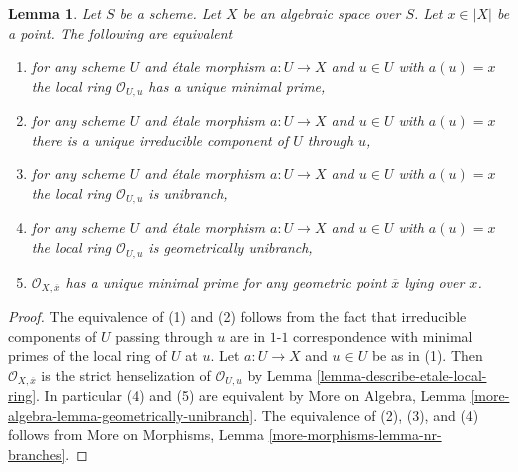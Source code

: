 \documentclass[10pt,a4paper]{amsart}
\theoremstyle{plain}
\newtheorem{lemma}[subsection]{Lemma}
\theoremstyle{definition}
\theoremstyle{remark}
\numberwithin{equation}{subsection}
\begin{document}
\begin{lemma}
\label{lemma-irreducible-local-ring}
Let $S$ be a scheme.
Let $X$ be an algebraic space over $S$.
Let $x \in |X|$ be a point.
The following are equivalent
\begin{enumerate}
\item for any scheme $U$ and \'etale morphism $a : U \to X$ and
$u \in U$ with $a(u) = x$ the local ring $\mathcal{O}_{U, u}$ has a
unique minimal prime,
\item for any scheme $U$ and \'etale morphism $a : U \to X$ and
$u \in U$ with $a(u) = x$ there is a unique irreducible component of $U$
through $u$,
\item for any scheme $U$ and \'etale morphism $a : U \to X$ and
$u \in U$ with $a(u) = x$ the local ring $\mathcal{O}_{U, u}$
is unibranch,
\item for any scheme $U$ and \'etale morphism $a : U \to X$ and
$u \in U$ with $a(u) = x$ the local ring $\mathcal{O}_{U, u}$
is geometrically unibranch,
\item $\mathcal{O}_{X, \overline{x}}$ has a unique minimal prime
for any geometric point $\overline{x}$ lying over $x$.
\end{enumerate}
\end{lemma}

\begin{proof}
The equivalence of (1) and (2) follows from the fact that irreducible
components of $U$ passing through $u$ are in $1$-$1$ correspondence with
minimal primes of the local ring of $U$ at $u$. Let $a : U \to X$ and
$u \in U$ be as in (1). Then $\mathcal{O}_{X, \overline{x}}$ is
the strict henselization of $\mathcal{O}_{U, u}$ by
Lemma \ref{lemma-describe-etale-local-ring}.
In particular (4) and (5) are equivalent by
More on Algebra, Lemma \ref{more-algebra-lemma-geometrically-unibranch}.
The equivalence of (2), (3), and (4) follows from
More on Morphisms, Lemma \ref{more-morphisms-lemma-nr-branches}.
\end{proof}
\end{document}
